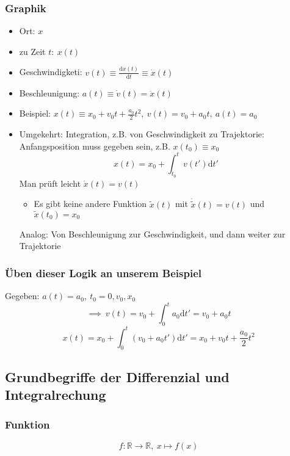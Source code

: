 \documentclass[a4paper]{scrartcl}
\theoremstyle{definition}
\theoremstyle{plain}
\theoremstyle{remark}
\theoremstyle{remark}
\begin{document}
\subsubsection{Graphik}
\label{sec-2-1-1}
\begin{itemize}
\item Ort: $x$
\item zu Zeit $t:~x(t)$
\item Geschwindigketi: $v(t) \equiv \frac{\mathrm{d}x(t)}{\mathrm{d}t} \equiv \dot{x}(t)$
\item Beschleunigung: $a(t) \equiv \dot{v}(t) = \ddot{x}(t)$
\item Beispiel: $x(t) \equiv x_0 + v_0 t + \frac{a_0}{2}t^2, ~v(t) = v_0 + a_0 t,~a(t) = a_0$
\item Umgekehrt: Integration, z.B. von Geschwindigkeit zu Trajektorie: Anfangsposition muss gegeben sein, z.B. $x(t_0) \equiv x_0$
     \[x(t)=x_0 + \int_{t_0}^{t}v(t')\mathrm{d}t'\]
     Man prüft leicht $\dot{x}(t) = v(t)$
\begin{itemize}
\item Es gibt keine andere Funktion $\tilde{x}(t)$ mit $\dot{\tilde{x}}(t) = v(t)$ und $\tilde{x}(t_0) = x_0$
\end{itemize}
Analog: Von Beschleunigung zur Geschwindigkeit, und dann weiter zur Trajektorie
\end{itemize}
\subsubsection{Üben dieser Logik an unserem Beispiel}
\label{sec-2-1-2}
Gegeben: $a(t) = a_0,~t_0=0,v_0,x_0$ \\
    \[\implies~v(t) = v_0 + \int_0^t a_0\mathrm{d}t' = v_0 + a_0 t\]
\[x(t) = x_0 + \int_0^t (v_0 + a_0 t')\mathrm{d}t' = x_0 + v_0 t + \frac{a_0}{2}t^2\]
\subsection{Grundbegriffe der Differenzial und Integralrechung}
\label{sec-2-2}
\subsubsection{Funktion}
\label{sec-2-2-1}
\[f: \mathbb{R} \rightarrow \mathbb{R},~x \mapsto f(x)\]
\end{document}
